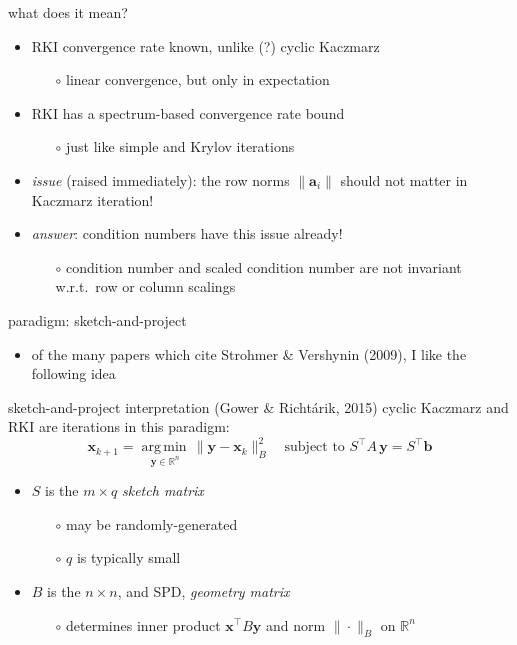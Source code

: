 \documentclass[usepdftitle=false,usenames,dvipsnames]{beamer}
\newcommand{\RR}{\mathbb{R}}
\newcommand{\argmin}[1]{\underset{#1}{\operatorname{arg\, min}\,}}
\newcommand{\ba}{\mathbf{a}}
\newcommand{\bb}{\mathbf{b}}
\newcommand{\bx}{\mathbf{x}}
\newcommand{\by}{\mathbf{y}}
\begin{document}
\begin{frame}{what does it mean?}

\begin{itemize}
\item RKI convergence rate known, unlike (?) cyclic Kaczmarz
    \begin{itemize}
    \item[$\circ$] linear convergence, but only in expectation
    \end{itemize}
\item RKI has a \alert{spectrum-based convergence rate bound}
    \begin{itemize}
    \item[$\circ$] just like simple and Krylov iterations
    \end{itemize}
\item \emph{issue} (raised immediately): the row norms $\|\ba_i\|$ should not matter in Kaczmarz iteration!
\item \emph{answer}: condition numbers have this issue already!
    \begin{itemize}
    \item[$\circ$] condition number and scaled condition number are not invariant w.r.t.~row or column scalings
    \end{itemize}
\end{itemize}
\end{frame}


\begin{frame}{paradigm: sketch-and-project}

\begin{itemize}
\item of the many papers which cite Strohmer \& Vershynin (2009), I like the following idea
\end{itemize}

\begin{block}{sketch-and-project interpretation (Gower \& Richt\'arik, 2015)}
cyclic Kaczmarz and RKI are iterations in this paradigm:
    $$\bx_{k+1} = \argmin{\by \in \RR^n} \|\by - \bx_k\|_B^2 \quad \text{subject to } S^\top A\, \by = S^\top \bb$$
\end{block}

\begin{itemize}
\item $S$ is the $m\times q$ \emph{sketch matrix}
    \begin{itemize}
    \item[$\circ$] may be randomly-generated
    \item[$\circ$] $q$ is typically small
    \end{itemize}
\item $B$ is the $n\times n$, and SPD, \emph{geometry matrix} 
    \begin{itemize}
    \item[$\circ$] determines inner product $\bx^\top B \by$ and norm $\|\cdot\|_B$ on $\RR^n$
    \end{itemize}
\end{itemize}
\end{frame}
\end{document}
